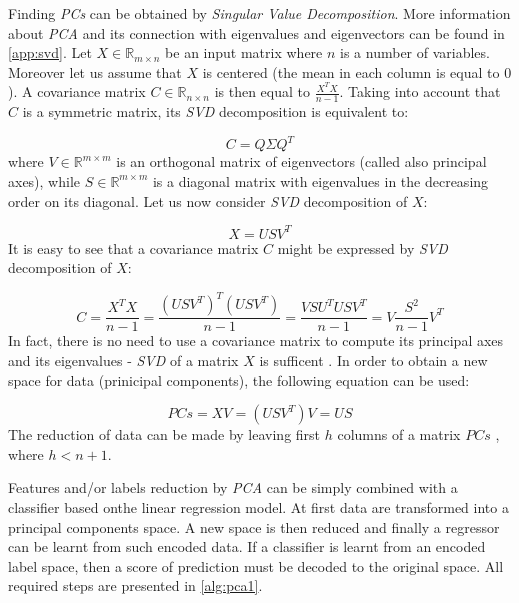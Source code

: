Finding \textit{PCs} can be obtained by \textit{Singular Value Decomposition}. More information about \textit{PCA} and its connection with eigenvalues and eigenvectors can be found in \cref{app:svd}. Let $X \in \mathbb{R}_{m \times n}$ be an input matrix where $n$ is a number of variables. Moreover let us assume that $X$ is centered (the mean in each column is equal to $0$). A covariance matrix $C \in \mathbb{R}_{n \times n}$ is then equal to $\frac{X^TX}{n-1}$. Taking into account that $C$ is a symmetric matrix, its \textit{SVD} decomposition is equivalent to:

\begin{equation}\label{eq:pca1}
    C=Q\Sigma{Q^T}
\end{equation}
where $V \in \mathbb{R}^{m \times m}$ is an orthogonal matrix of eigenvectors (called also principal axes), while $S \in \mathbb{R}^{m \times m}$ is a diagonal matrix with eigenvalues in the decreasing order on its diagonal. 
Let us now consider \textit{SVD} decomposition of $X$:

\begin{equation}\label{eq:pca2}
    X=USV^{T}
\end{equation}
It is easy to see that a covariance matrix $C$ might be expressed by \textit{SVD} decomposition of $X$:

\begin{equation}\label{eq:pca3}
    C=\frac{X^TX}{n-1} = \frac{(USV^T)^T(USV^T)}{n-1} = \frac{VSU^TUSV^T}{n-1} = V\frac{S^{2}}{n-1}V^{T} 
\end{equation}
In fact, there is no need to use a covariance matrix to compute its principal axes and its eigenvalues - \textit{SVD} of a matrix $X$ is sufficent \cite{Jolliffe}. In order to obtain a new space for data (prinicipal components), the following equation can be used:

\begin{equation}\label{eq:pca4}
    PCs = XV = (USV^{T})V = US
\end{equation}
The reduction of data can be made by leaving first $h$ columns of a matrix $PCs$ , where $h<n+1$.

Features and/or labels reduction by \textit{PCA} can be simply combined with a classifier based onthe linear regression model. At first data are transformed into a principal components space. A new space is then reduced and finally a regressor can be learnt from such encoded data. If a classifier is learnt from an encoded label space, then a score of prediction must be decoded to the original space. All required steps are presented in \cref{alg:pca1}.

